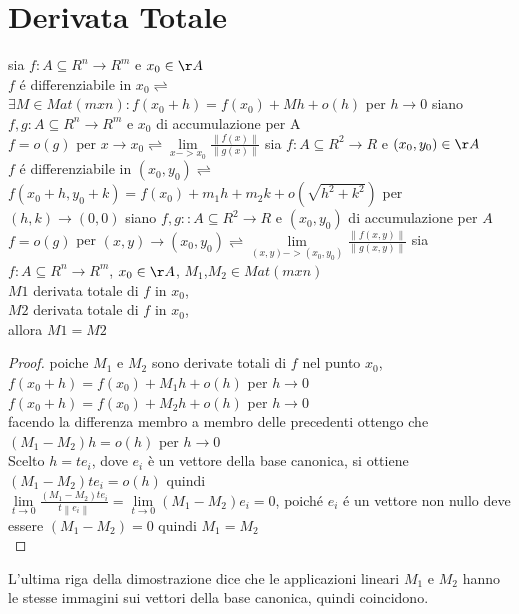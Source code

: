 \section{Derivata Totale}
sia $f:A\subseteq R^n\rightarrow R^m$ e $x_0\in\AA$ \\
$f$ \'e differenziabile in $x_0\rightleftharpoons$ $\exists M\in Mat(mxn) : f(x_0+h) = f(x_0)+Mh+o(h)$ per $h\rightarrow 0$ 
siano $f,g : A\subseteq R^n\rightarrow R^m$ e $x_0$ di accumulazione per A \\
$f=o(g)$ per $x\rightarrow x_0 \rightleftharpoons \lim\limits_{x->x_0}\frac{\left\| f(x)\right\| }{\left\| g(x)\right\| }$
sia $f:A\subseteq R^2\rightarrow R$ e $(x_0,y_0)\in\AA$ \\
$f$ \'e differenziabile in $(x_0,y_0)\rightleftharpoons$ $f(x_0+h,y_0+k) = f(x_0)+m_1h+m_2k+o(\sqrt{h^2+k^2})$ per $(h,k)\rightarrow (0,0)$
siano $f,g : :A\subseteq R^2\rightarrow R$ e $(x_0,y_0)$ di accumulazione per $A$ \\
$f=o(g)$ per $(x,y)\rightarrow (x_0,y_0) \rightleftharpoons \lim\limits_{(x,y)->(x_0,y_0)}\frac{\left\| f(x,y)\right\| }{\left\| g(x,y)\right\| }$
sia $f:A\subseteq R^n\rightarrow R^m$, $x_0\in\AA$, $M_1$,$M_2\in Mat(mxn)$\\
$M1$ derivata totale di $f$ in $x_0$,\\
$M2$ derivata totale di $f$ in $x_0$,\\
allora $M1=M2$\\
\begin{proof}
	poiche $M_1$ e $M_2$ sono derivate totali di $f$ nel punto $x_0$,\\
	$f(x_0+h) = f(x_0)+M_1h+o(h)$ per $h\rightarrow 0$\\
	$f(x_0+h) = f(x_0)+M_2h+o(h)$ per $h\rightarrow 0$\\
	facendo la differenza membro a membro delle precedenti ottengo che $(M_1-M_2)h=o(h)$ per $h\rightarrow 0$\\
	Scelto $h=te_i$, dove $e_i$ è un vettore della base canonica, si ottiene $(M_1-M_2)te_i=o(h)$ quindi\\
	$\lim\limits_{t\rightarrow 0}\frac{(M_1-M_2)te_i}{t\left\| e_i\right\| } = \lim\limits_{t\rightarrow 0}(M_1-M_2)e_i = 0$, poich\'e $e_i$ \'e un vettore non nullo deve essere $(M_1-M_2)=0$ quindi $M_1 = M_2$\\
\end{proof}
\observation
L'ultima riga della dimostrazione dice che le applicazioni lineari $M_1$ e $M_2$ hanno le stesse immagini sui vettori della base canonica, quindi coincidono.

